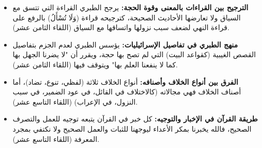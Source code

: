 \begin{itemize}
    \item \textbf{الترجيح بين القراءات بالمعنى وقوة الحجة:} يرجح الطبري القراءة التي تتسق مع السياق ولا تعارضها الأحاديث الصحيحة، كترجيحه قراءة (وَلَا تُسْأَلُ) بالرفع على قراءة النهي لضعف سبب نزولها واتساقها مع السياق (اللقاء الثامن عشر).
    \item \textbf{منهج الطبري في تفاصيل الإسرائيليات:} يؤسس الطبري لعدم الجزم بتفاصيل القصص الغيبية (كقواعد البيت) التي لم تصح بها حجة، ويقرر أن "لا يضرنا الجهل بها كما لا ينفعنا العلم بها" ويتوقف فيها (اللقاء الثامن عشر).
    \item \textbf{الفرق بين أنواع الخلاف وأصنافه:} أنواع الخلاف ثلاثة (لفظي، تنوع، تضاد)، أما أصناف الخلاف فهي مجالاته (كالاختلاف في القائل، في عود الضمير، في سبب النزول، في الإعراب) (اللقاء التاسع عشر).
    \item \textbf{طريقة القرآن في الإخبار والتوجيه:} كل خبر في القرآن يتبعه توجيه للعمل والتصرف الصحيح، فالله يخبرنا بمكر الأعداء ليوجهنا للثبات والعمل الصحيح ولا نكتفي بمجرد المعرفة (اللقاء التاسع عشر).
\end{itemize}

